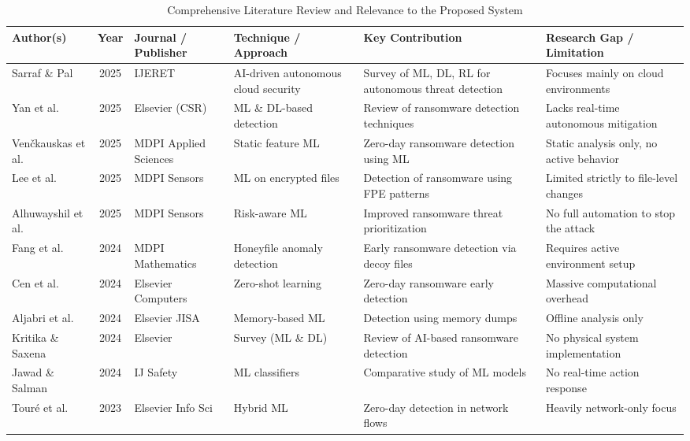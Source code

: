 \documentclass[conference]{IEEEtran}
\begin{document}
\begin{table}[t]
\centering
\caption{Comprehensive Literature Review and Relevance to the Proposed System}
\label{tab:literature_review}
\renewcommand{\arraystretch}{1.2}
\begin{tabular}{l c p{2.2cm} p{2.8cm} p{3.8cm} p{3.8cm}}
\toprule
\textbf{Author(s)} & \textbf{Year} & \textbf{Journal / Publisher} & \textbf{Technique / Approach} & \textbf{Key Contribution} & \textbf{Research Gap / Limitation} \\
\midrule
Sarraf \& Pal \cite{sarraf2025ai} & 2025 & IJERET & AI-driven autonomous cloud security & Survey of ML, DL, RL for autonomous threat detection & Focuses mainly on cloud environments \\
Yan et al. \cite{yan2025ml} & 2025 & Elsevier (CSR) & ML \& DL-based detection & Review of ransomware detection techniques & Lacks real-time autonomous mitigation \\
Venčkauskas et al. \cite{venckauskas2025zero} & 2025 & MDPI Applied Sciences & Static feature ML & Zero-day ransomware detection using ML & Static analysis only, no active behavior \\
Lee et al. \cite{lee2025ml} & 2025 & MDPI Sensors & ML on encrypted files & Detection of ransomware using FPE patterns & Limited strictly to file-level changes \\
Alhuwayshil et al. \cite{alhuwayshil2025risk} & 2025 & MDPI Sensors & Risk-aware ML & Improved ransomware threat prioritization & No full automation to stop the attack \\
Fang et al. \cite{fang2024honeyfile} & 2024 & MDPI Mathematics & Honeyfile anomaly detection & Early ransomware detection via decoy files & Requires active environment setup \\
Cen et al. \cite{cen2024zeroshot} & 2024 & Elsevier Computers & Zero-shot learning & Zero-day ransomware early detection & Massive computational overhead \\
Aljabri et al. \cite{aljabri2024memory} & 2024 & Elsevier JISA & Memory-based ML & Detection using memory dumps & Offline analysis only \\
Kritika \& Saxena \cite{kritika2024survey} & 2024 & Elsevier & Survey (ML \& DL) & Review of AI-based ransomware detection & No physical system implementation \\
Jawad \& Salman \cite{jawad2024ml} & 2024 & IJ Safety & ML classifiers & Comparative study of ML models & No real-time action response \\
Touré et al. \cite{toure2023hybrid} & 2023 & Elsevier Info Sci & Hybrid ML & Zero-day detection in network flows & Heavily network-only focus \\

\end{tabular}
\end{table}
\end{document}
